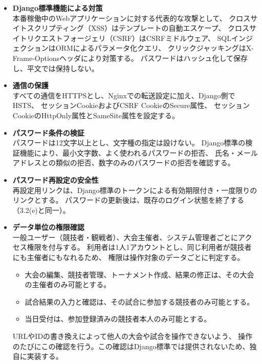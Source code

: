 \begin{itemize}
    \item \textbf{Django標準機能による対策} \\
    本番稼働中のWebアプリケーションに対する代表的な攻撃として、
    クロスサイトスクリプティング（XSS）はテンプレートの自動エスケープ、
    クロスサイトリクエストフォージェリ（CSRF）はCSRFミドルウェア、
    SQLインジェクションはORMによるパラメータ化クエリ、
    クリックジャッキングはX-Frame-Optionsヘッダにより対策する。
    パスワードはハッシュ化して保存し、平文では保持しない。

    \item \textbf{通信の保護} \\
    すべての通信をHTTPSとし、Nginxでの転送設定に加え、Django側でHSTS、
    セッションCookieおよびCSRF CookieのSecure属性、
    セッションCookieのHttpOnly属性とSameSite属性を設定する。

    \item \textbf{パスワード条件の検証} \\
    パスワードは12文字以上とし、文字種の指定は設けない。
    Django標準の検証機能により、最小文字数、よく使われるパスワードの拒否、
    氏名・メールアドレスとの類似の拒否、数字のみのパスワードの拒否を確認する。

    \item \textbf{パスワード再設定の安全性} \\
    再設定用リンクは、Django標準のトークンによる有効期限付き・一度限りのリンクとする。
    パスワードの更新後は、既存のログイン状態を終了する（3.2(e)と同一）。

    \item \textbf{データ単位の権限確認} \\
    一般ユーザー（競技者・観戦者）、大会主催者、システム管理者ごとにアクセス権限を付与する。
    利用者は1人1アカウントとし、同じ利用者が競技者にも主催者にもなれるため、
    権限は操作対象のデータごとに判定する。
    \begin{itemize}
        \item 大会の編集、競技者管理、トーナメント作成、結果の修正は、その大会の主催者のみ可能とする。
        \item 試合結果の入力と確認は、その試合に参加する競技者のみ可能とする。
        \item 当日受付は、参加登録済みの競技者本人のみ可能とする。
    \end{itemize}
    URLやIDの書き換えによって他人の大会や試合を操作できないよう、
    操作のたびにこの確認を行う。この確認はDjango標準では提供されないため、独自に実装する。


\end{itemize}
